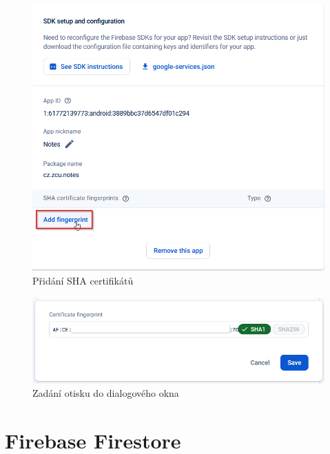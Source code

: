 \documentclass[czech, bc, kiv, he, iso690numb]{fasthesis}
\begin{document}
\begin{enumerate}
\begin{enumerate}
        \begin{figure}[h!]
    \centering
    \includegraphics[width=1\textwidth]{img/BP-Runt/firebase-configuration/google-sign-in/adding-fingerprint.png}
    \caption{Přidání \gls{SHA} certifikátů}
    \label{fig:add-fingerprint}
    \end{figure}

    \begin{figure}[h!]
    \centering
    \includegraphics[width=1\textwidth]{img/BP-Runt/firebase-configuration/google-sign-in/fingerprint.png}
    \caption{Zadání otisku do dialogového okna}
    \label{fig:fingerprint}
    \end{figure}
    
    \end{enumerate}
    
\end{enumerate}

\newpage

\section{Firebase Firestore}
\end{document}
